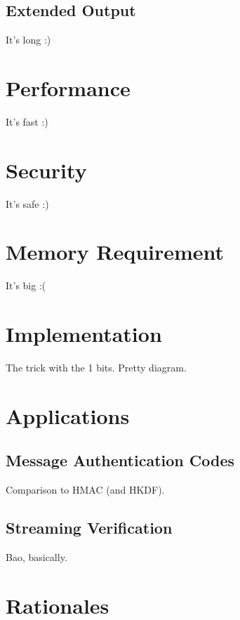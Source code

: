 \documentclass[11pt,notitlepage,a4paper]{article}
\begin{document}
\subsection{Extended Output}\label{sec:extended}

It's long :)

\section{Performance}\label{sec:performance}

It's fast :)

\section{Security}\label{sec:security}

It's safe :)

\section{Memory Requirement}\label{sec:memory}

It's big :(

\section{Implementation}\label{sec:memory}

The trick with the 1 bits. Pretty diagram.

\section{Applications}\label{sec:memory}

  \subsection{Message Authentication Codes}\label{sec:mac}

  Comparison to HMAC (and HKDF).

  \subsection{Streaming Verification}\label{sec:streamingverification}

  Bao, basically.

\section{Rationales}\label{sec:rationales}
\end{document}
